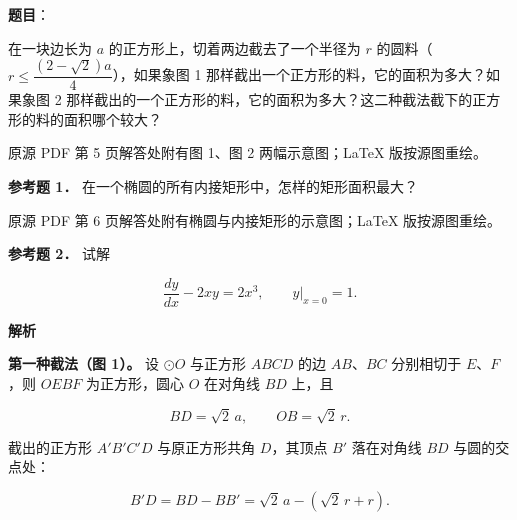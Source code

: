 \begin{answer}

\textbf{题目}：

在一块边长为 $a$ 的正方形上，切着两边截去了一个半径为 $r$ 的圆料（$r\leqslant\dfrac{(2-\sqrt2)a}{4}$），如果象图 1 那样截出一个正方形的料，它的面积为多大？如果象图 2 那样截出的一个正方形的料，它的面积为多大？这二种截法截下的正方形的料的面积哪个较大？

\begin{gktip}
原源 PDF 第 5 页解答处附有图 1、图 2 两幅示意图；LaTeX 版按源图重绘。
\end{gktip}
\nopagebreak[4]
\begin{center}\end{center}
\nopagebreak[4]
\nopagebreak[4]
\begin{center}\end{center}
\nopagebreak[4]
\textbf{参考题 1．} 在一个椭圆的所有内接矩形中，怎样的矩形面积最大？

\begin{gktip}
原源 PDF 第 6 页解答处附有椭圆与内接矩形的示意图；LaTeX 版按源图重绘。
\end{gktip}
\nopagebreak[4]
\begin{center}\end{center}
\nopagebreak[4]
\textbf{参考题 2．} 试解

\nopagebreak[4]
\[
\frac{dy}{dx}-2xy=2x^3,
\qquad
y\Big|_{x=0}=1.
\]

\textbf{解析}
\nopagebreak[4]
\begin{center}\end{center}
\nopagebreak[4]
\nopagebreak[4]
\begin{center}\end{center}
\nopagebreak[4]
\textbf{第一种截法（图 1）。} 设 $\odot O$ 与正方形 $ABCD$ 的边 $AB\text{、}BC$ 分别相切于 $E\text{、}F$，则 $OEBF$ 为正方形，圆心 $O$ 在对角线 $BD$ 上，且

\nopagebreak[4]
\[
BD=\sqrt2\,a,
\qquad
OB=\sqrt2\,r.
\]

截出的正方形 $A'B'C'D$ 与原正方形共角 $D$，其顶点 $B'$ 落在对角线 $BD$ 与圆的交点处：

\nopagebreak[4]
\[
B'D=BD-BB'=\sqrt2\,a-(\sqrt2\,r+r).
\]


\end{answer}
